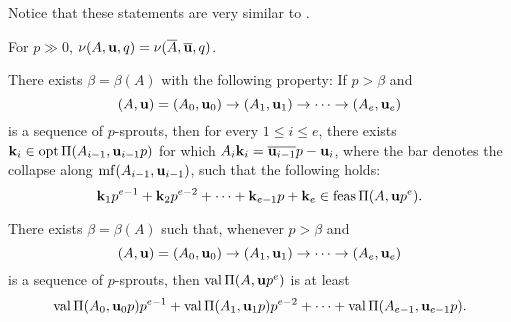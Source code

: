 \documentclass[11pt]{amsart}
\begin{document}


Notice that these statements are very similar to . 

\begin{corollary}
For $p \gg 0$, 
 $\nu(A, \mathbf{u}, q) = \nu(\overline{A}, \overline{\mathbf{u}}, q)$. 
\end{corollary}


\begin{lemma}
 There exists $\beta = \beta(A)$ with the following property:  If $p > \beta$ and 
 \[
(A, \mathbf{u}) = (A_0, \mathbf{u}_0) \to (A_1, \mathbf{u}_1) \to \cdots \to (A_e, \mathbf{u}_e)
 \]
 is a sequence of $p$-sprouts, then for every $1 \leq i \leq e$, there exists $\mathbf{k}_i \in \operatorname{opt} \Pi(A_{i-1}, \mathbf{u}_{i-1} p)$ 
 for which $A_i \mathbf{k}_i = \overline{\mathbf{u}_{i-1}} p - \mathbf{u}_i$, where the bar denotes the collapse along $\operatorname{mf}(A_{i-1}, \mathbf{u}_{i-1})$, such that the following holds: 
 \[
  \mathbf{k}_1 p^{e-1} + \mathbf{k}_2 p^{e-2} + \cdots + \mathbf{k}_{e-1} p + \mathbf{k}_e \in \operatorname{feas} \Pi(A, \mathbf{u}p^e).
 \]
\end{lemma}

\begin{corollary}
There exists $\beta = \beta(A)$ such that, whenever $p > \beta$ and 
 \[
(A, \mathbf{u}) = (A_0, \mathbf{u}_0) \to (A_1, \mathbf{u}_1) \to \cdots \to (A_e, \mathbf{u}_e)
 \]
is a sequence of $p$-sprouts,
then $\operatorname{val} \Pi(A, \mathbf{u} p^e)$ is at least
\[
\operatorname{val} \Pi(A_0, \mathbf{u}_0 p) p^{e-1} + \operatorname{val} \Pi(A_1, \mathbf{u}_1 p) p^{e-2} + \cdots + \operatorname{val} \Pi(A_{e-1}, \mathbf{u}_{e-1} p).
\]
\end{corollary}

\end{document}
